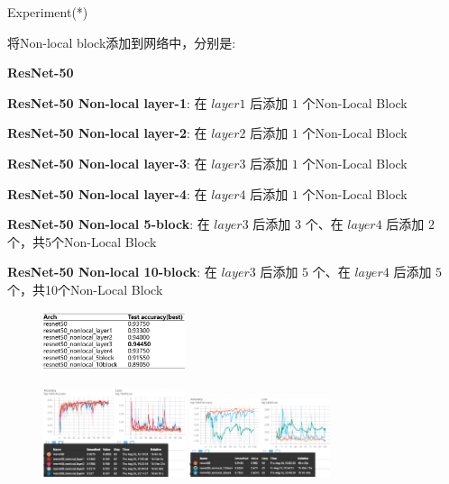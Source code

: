 \begin{frame}{Experiment(*)}
    \begin{multicols}{2}
        \begin{tiny}
            将Non-local block添加到网络中，分别是:

            \textbf{ResNet-50}

            \textbf{ResNet-50 Non-local layer-1}: 在 $layer1$ 后添加 $1$ 个Non-Local Block

            \textbf{ResNet-50 Non-local layer-2}: 在 $layer2$ 后添加 $1$ 个Non-Local Block

            \textbf{ResNet-50 Non-local layer-3}: 在 $layer3$ 后添加 $1$ 个Non-Local Block

            \textbf{ResNet-50 Non-local layer-4}: 在 $layer4$ 后添加 $1$ 个Non-Local Block

            \textbf{ResNet-50 Non-local 5-block}: 在 $layer3$ 后添加 $3$ 个、在 $layer4$ 后添加 $2$ 个，共5个Non-Local Block

            \textbf{ResNet-50 Non-local 10-block}: 在 $layer3$ 后添加 $5$ 个、在 $layer4$ 后添加 $5$ 个，共10个Non-Local Block
        \end{tiny}

        \begin{figure}
            \centering
            \includegraphics[width=0.37\textwidth]{docs/paperReading/Non-local/table.png}
        \end{figure}
        \begin{figure}
            \centering
            \includegraphics[width=0.37\textwidth]{docs/paperReading/Non-local/testacc-1.png}
            \includegraphics[width=0.37\textwidth]{docs/paperReading/Non-local/testacc-2.png}
        \end{figure}
    \end{multicols}
\end{frame}

